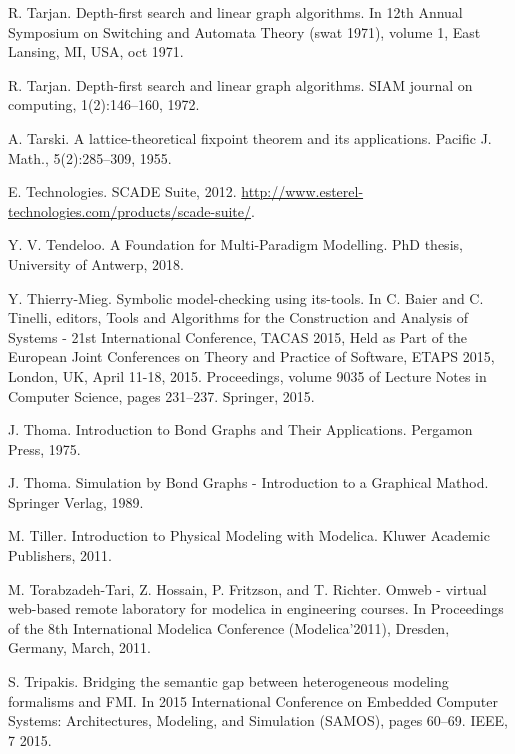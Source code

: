 \begin{description}[style=nextline,leftmargin=12mm,labelwidth=10mm,font=\normalfont]
\item[{[262]}] R. Tarjan. Depth-first search and linear graph algorithms. In 12th Annual Symposium on Switching and Automata Theory (swat 1971), volume 1, East Lansing, MI, USA, oct 1971.

\item[{[263]}] R. Tarjan. Depth-first search and linear graph algorithms. SIAM journal on computing, 1(2):146–160, 1972.

\item[{[264]}] A. Tarski. A lattice-theoretical fixpoint theorem and its applications. Pacific J. Math., 5(2):285–309, 1955.

\item[{[265]}] E. Technologies. SCADE Suite, 2012. \url{http://www.esterel-technologies.com/products/scade-suite/}.

\item[{[266]}] Y. V. Tendeloo. A Foundation for Multi-Paradigm Modelling. PhD thesis, University of Antwerp, 2018.

\item[{[267]}] Y. Thierry-Mieg. Symbolic model-checking using its-tools. In C. Baier and C. Tinelli, editors, Tools and Algorithms for the Construction and Analysis of Systems - 21st International Conference, TACAS 2015, Held as Part of the European Joint Conferences on Theory and Practice of Software, ETAPS 2015, London, UK, April 11-18, 2015. Proceedings, volume 9035 of Lecture Notes in Computer Science, pages 231–237. Springer, 2015.

\item[{[268]}] J. Thoma. Introduction to Bond Graphs and Their Applications. Pergamon Press, 1975.

\item[{[269]}] J. Thoma. Simulation by Bond Graphs - Introduction to a Graphical Mathod. Springer Verlag, 1989.

\item[{[270]}] M. Tiller. Introduction to Physical Modeling with Modelica. Kluwer Academic Publishers, 2011.

\item[{[271]}] M. Torabzadeh-Tari, Z. Hossain, P. Fritzson, and T. Richter. Omweb - virtual web-based remote laboratory for modelica in engineering courses. In Proceedings of the 8th International Modelica Conference (Modelica’2011), Dresden, Germany, March, 2011.

\item[{[272]}] S. Tripakis. Bridging the semantic gap between heterogeneous modeling formalisms and FMI. In 2015 International Conference on Embedded Computer Systems: Architectures, Modeling, and Simulation (SAMOS), pages 60–69. IEEE, 7 2015.


\end{description}
